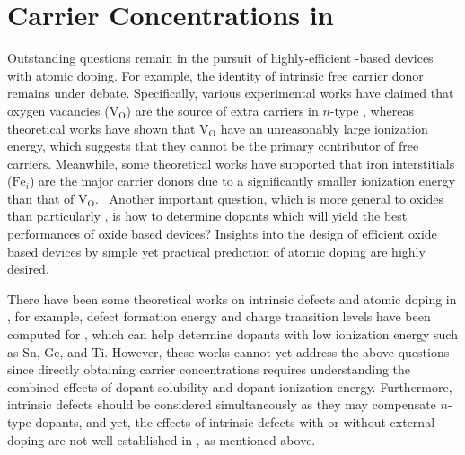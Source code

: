 \def\vacancy{\text{V}}
\newcommand{\vac}[1]{\vacancy_\text{#1}}
\newcommand{\sub}[2]{\text{#1}_\text{#2}}
\newcommand{\itl}[1]{\text{#1}_i}
\def\vo{\vac{O}}
\def\vfe{\vac{Fe}}
\def\oi{\itl{O}}
\def\fei{\itl{Fe}}

\newcommand{\dmu}[1]{\Delta\mu_\text{#1}}
\def\po{p_{\rm O_2}}
\def\logp{\log (\po)}
\def\ep{EP}


\section{Carrier Concentrations in }

Outstanding questions remain in the pursuit of highly-efficient -based devices with atomic doping. For example, the identity of intrinsic free carrier donor remains under debate.
Specifically, various experimental works have claimed that oxygen vacancies ($\vo$) are the source of extra carriers in $n$-type , \cite{zhang2019interfacial} whereas theoretical works have shown that $\vo$ have an unreasonably large ionization energy,\cite{smart2017effect} which suggests that they cannot be the primary contributor of free carriers. Meanwhile, some theoretical works have supported that iron interstitials ($\fei$) are the major carrier donors due to a significantly smaller ionization energy than that of $\vo$.~\cite{lee2013thermodynamics} Another important question, which is more general to oxides than particularly , is how to determine dopants which will yield the best performances of oxide based devices? Insights into the design of efficient oxide based devices by simple yet practical prediction of atomic doping are highly desired.~\cite{yang2017progress}

There have been some theoretical works on intrinsic defects and atomic doping in , for example, defect formation energy and charge transition levels have been computed for , which can help determine dopants with low ionization energy such as Sn, Ge, and Ti. \cite{smart2017effect,zhou2015understanding}
However, these works cannot yet address the above questions since directly obtaining carrier concentrations requires understanding the combined effects of dopant solubility and dopant ionization energy.
Furthermore, intrinsic defects should be considered simultaneously as they may compensate $n$-type dopants, and yet, the effects of intrinsic defects with or without external doping are not well-established in , as mentioned above.

